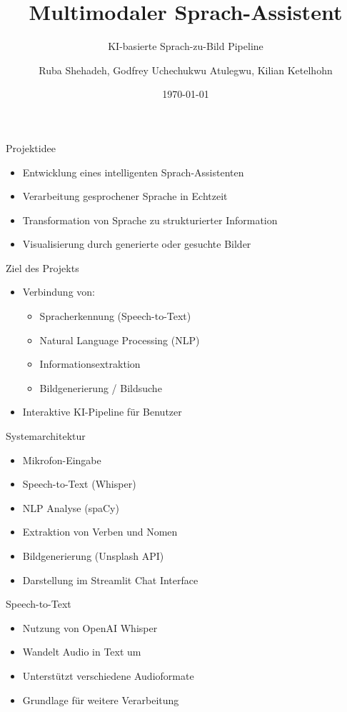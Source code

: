 \documentclass{beamer}
\title{Multimodaler Sprach-Assistent}
\subtitle{KI-basierte Sprach-zu-Bild Pipeline}
\author{Ruba Shehadeh, Godfrey Uchechukwu Atulegwu, Kilian Ketelhohn}
\date{\today}
\begin{document}
\frame{\titlepage}

\begin{frame}{Projektidee}
\begin{itemize}
    \item Entwicklung eines intelligenten Sprach-Assistenten
    \item Verarbeitung gesprochener Sprache in Echtzeit
    \item Transformation von Sprache zu strukturierter Information
    \item Visualisierung durch generierte oder gesuchte Bilder
\end{itemize}
\end{frame}

\begin{frame}{Ziel des Projekts}
\begin{itemize}
    \item Verbindung von:
    \begin{itemize}
        \item Spracherkennung (Speech-to-Text)
        \item Natural Language Processing (NLP)
        \item Informationsextraktion
        \item Bildgenerierung / Bildsuche
    \end{itemize}
    \item Interaktive KI-Pipeline für Benutzer
\end{itemize}
\end{frame}

\begin{frame}{Systemarchitektur}
\begin{itemize}
    \item Mikrofon-Eingabe
    \item Speech-to-Text (Whisper)
    \item NLP Analyse (spaCy)
    \item Extraktion von Verben und Nomen
    \item Bildgenerierung (Unsplash API)
    \item Darstellung im Streamlit Chat Interface
\end{itemize}
\end{frame}

\begin{frame}{Speech-to-Text}
\begin{itemize}
    \item Nutzung von OpenAI Whisper
    \item Wandelt Audio in Text um
    \item Unterstützt verschiedene Audioformate
    \item Grundlage für weitere Verarbeitung
\end{itemize}
\end{frame}
\end{document}
